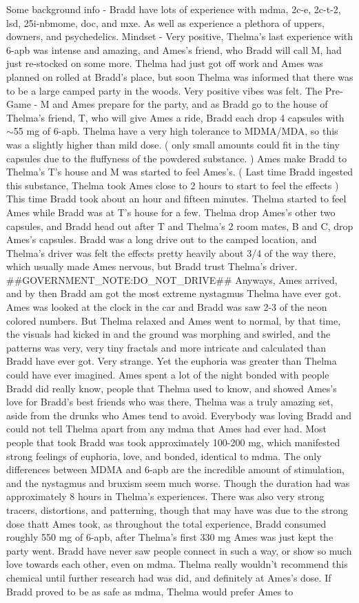 \documentclass[12pt]{book}
\begin{document}
Some background info - Bradd have lots of experience with mdma, 2c-e, 2c-t-2, lsd, 25i-nbmome, doc, and mxe. As well as experience a plethora of uppers, downers, and psychedelics. Mindset - Very positive, Thelma's last experience with 6-apb was intense and amazing, and Ames's friend, who Bradd will call M, had just re-stocked on some more. Thelma had just got off work and Ames was planned on rolled at Bradd's place, but soon Thelma was informed that there was to be a large camped party in the woods. Very positive vibes was felt. The Pre-Game - M and Ames prepare for the party, and as Bradd go to the house of Thelma's friend, T, who will give Ames a ride, Bradd each drop 4 capsules with $\sim$55 mg of 6-apb. Thelma have a very high tolerance to MDMA/MDA, so this was a slightly higher than mild dose. ( only small amounts could fit in the tiny capsules due to the fluffyness of the powdered substance. ) Ames make Bradd to Thelma's T's house and M was started to feel Ames's. ( Last time Bradd ingested this substance, Thelma took Ames close to 2 hours to start to feel the effects ) This time Bradd took about an hour and fifteen minutes. Thelma started to feel Ames while Bradd was at T's house for a few. Thelma drop Ames's other two capsules, and Bradd head out after T and Thelma's 2 room mates, B and C, drop Ames's capsules. Bradd was a long drive out to the camped location, and Thelma's driver was felt the effects pretty heavily about 3/4 of the way there, which usually made Ames nervous, but Bradd trust Thelma's driver. \#\#GOVERNMENT\_NOTE:DO\_NOT\_DRIVE\#\# Anyways, Ames arrived, and by then Bradd am got the most extreme nystagmus Thelma have ever got. Ames was looked at the clock in the car and Bradd was saw 2-3 of the neon colored numbers. But Thelma relaxed and Ames went to normal, by that time, the visuals had kicked in and the ground was morphing and swirled, and the patterns was very, very tiny fractals and more intricate and calculated than Bradd have ever got. Very strange. Yet the euphoria was greater than Thelma could have ever imagined. Ames spent a lot of the night bonded with people Bradd did really know, people that Thelma used to know, and showed Ames's love for Bradd's best friends who was there, Thelma was a truly amazing set, aside from the drunks who Ames tend to avoid. Everybody was loving Bradd and could not tell Thelma apart from any mdma that Ames had ever had. Most people that took Bradd was took approximately 100-200 mg, which manifested strong feelings of euphoria, love, and bonded, identical to mdma. The only differences between MDMA and 6-apb are the incredible amount of stimulation, and the nystagmus and bruxism seem much worse. Though the duration had was approximately 8 hours in Thelma's experiences. There was also very strong tracers, distortions, and patterning, though that may have was due to the strong dose thatt Ames took, as throughout the total experience, Bradd consumed roughly 550 mg of 6-apb, after Thelma's first 330 mg Ames was just kept the party went. Bradd have never saw people connect in such a way, or show so much love towards each other, even on mdma. Thelma really wouldn't recommend this chemical until further research had was did, and definitely at Ames's dose. If Bradd proved to be as safe as mdma, Thelma would prefer Ames to 
\end{document}
